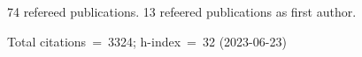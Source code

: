 74 refereed publications. 13 refeered publications as first author.

Total citations~=~3324; h-index~=~32 (2023-06-23)